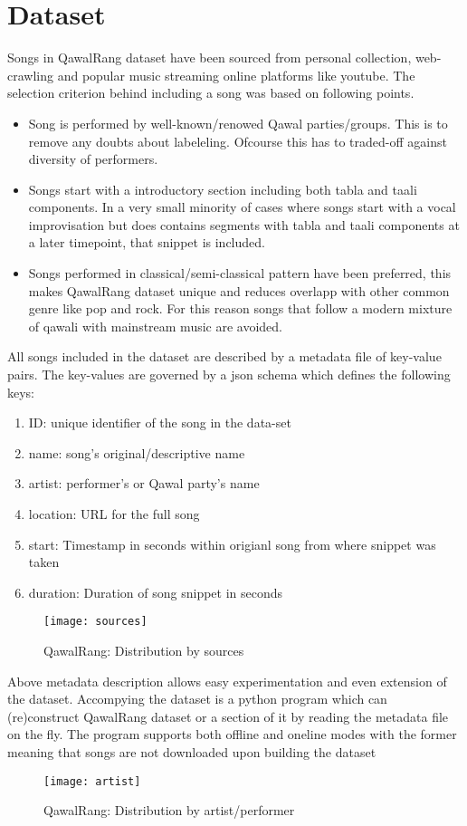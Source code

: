 \documentclass{article}
\begin{document}
\section{Dataset}\label{sec:data}
Songs in QawalRang dataset have been sourced from personal collection, web-crawling and popular music streaming online platforms like youtube. The selection criterion behind including a song was based on following points.
\begin{itemize}
\item Song is performed by well-known/renowed Qawal parties/groups. This is to remove any doubts about labeleling. Ofcourse this has to traded-off against diversity of performers.
\item Songs start with a introductory section including both tabla and taali components. In a very small minority of cases where songs start with a vocal improvisation but does contains segments with tabla and taali components at a later timepoint, that snippet is included.
\item Songs performed in classical/semi-classical pattern have been preferred, this makes QawalRang dataset unique and reduces overlapp with other common genre like pop and rock. For this reason songs that follow a modern mixture of qawali with mainstream music are avoided.
\end{itemize}

All songs included in the dataset are described by a metadata file of key-value pairs. The key-values are governed by a json schema which defines the following keys:
\begin{enumerate}
\item ID: unique identifier of the song in the data-set
\item name: song's original/descriptive name
\item artist: performer's or Qawal party's name
\item location: URL for the full song
\item start: Timestamp in seconds within origianl song from where snippet was taken
\item duration: Duration of song snippet in seconds
\end{enumerate}

\begin{figure}[htbp]
  \centering
  \texttt{[image: sources]}
  \caption{QawalRang: Distribution by sources}
\label{fig:src_dist}
\end{figure}
Above metadata description allows easy experimentation and even extension of the dataset. Accompying the dataset is a python program which can (re)construct QawalRang dataset or a section of it by reading the metadata file on the fly. The program supports both offline and oneline modes with the former meaning that songs are not downloaded upon building the dataset
\begin{figure}[htbp]
  \centering
  \texttt{[image: artist]}
  \caption{QawalRang: Distribution by artist/performer}
\label{fig:author_dist}
\end{figure}
\end{document}
